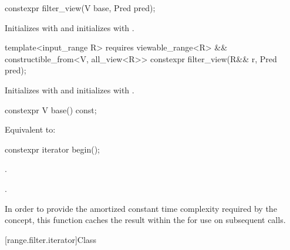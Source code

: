 \documentclass{wg21}
\begin{document}
%
\begin{itemdecl}
constexpr filter_view(V base, Pred pred);
\end{itemdecl}

\begin{itemdescr}
\pnum
\effects Initializes  with  and initializes
 with .
\end{itemdescr}

%
\begin{itemdecl}
template<input_range R>
requires viewable_range<R> && constructible_from<V, all_view<R>>
constexpr filter_view(R&& r, Pred pred);
\end{itemdecl}

\begin{itemdescr}
\pnum
\effects Initializes  with 
and initializes  with .
\end{itemdescr}

%
\begin{itemdecl}
constexpr V base() const;
\end{itemdecl}

\begin{itemdescr}
\pnum
\effects Equivalent to: 
\end{itemdescr}

%
\begin{itemdecl}
constexpr iterator begin();
\end{itemdecl}

\begin{itemdescr}
\pnum
\expects
{}.

\pnum
\returns
{}.

\pnum
\remarks In order to provide the amortized constant time complexity required by
the  concept,   this function caches the result within the
 for use on subsequent calls.
\end{itemdescr}

[range.filter.iterator]{Class }
\end{document}
